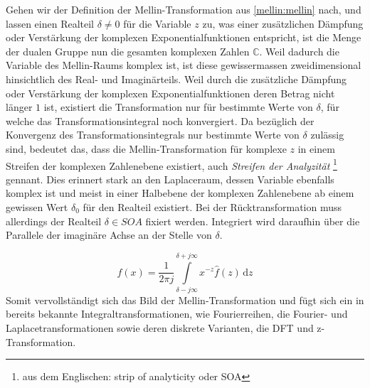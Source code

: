 Gehen wir der Definition der Mellin-Transformation aus \eqref{mellin:mellin} nach, und lassen einen Realteil $\delta \neq 0$ für die Variable $z$ zu, 
was einer zusätzlichen Dämpfung oder Verstärkung der komplexen Exponentialfunktionen entspricht, ist die Menge der dualen Gruppe nun die gesamten 
komplexen Zahlen $\mathbb{C}$.
Weil dadurch die Variable des Mellin-Raums komplex ist, ist diese gewissermassen zweidimensional hinsichtlich des Real- und Imaginärteils. 
Weil durch die zusätzliche Dämpfung oder Verstärkung der komplexen Exponentialfunktionen deren Betrag nicht länger $1$ ist, existiert die Transformation 
nur für bestimmte Werte von $\delta$, für welche das Transformationsintegral noch konvergiert.
Da bezüglich der Konvergenz des Transformationsintegrals nur bestimmte Werte von $\delta$ zulässig sind, bedeutet das, dass die Mellin-Transformation 
für komplexe $z$ in einem Streifen der komplexen Zahlenebene existiert, auch \emph{Streifen der Analyzität} 
\footnote{aus dem Englischen: strip of analyticity oder SOA} gennant.
Dies erinnert stark an den Laplaceraum, dessen Variable ebenfalls komplex ist und meist in einer Halbebene der komplexen Zahlenebene ab einem 
gewissen Wert $\delta_0$ für den Realteil existiert.
Bei der Rücktransformation muss allerdings der Realteil $\delta \in SOA$ fixiert werden. 
Integriert wird daraufhin über die Parallele der imaginäre Achse an der Stelle von $\delta$. 

\begin{equation}
    f(x) = \frac{1}{2\pi j} \int\limits_{\delta -j\infty}^{\delta +j\infty} x^{-z} \hat{f}(z) \,\mathrm{d}z
    \label{mellin:mellininv}
\end{equation}
Somit vervollständigt sich das Bild der Mellin-Transformation und fügt sich ein in bereits bekannte Integraltransformationen, wie Fourierreihen, 
die Fourier- und Laplacetransformationen sowie deren diskrete Varianten, die DFT und z-Transformation.



